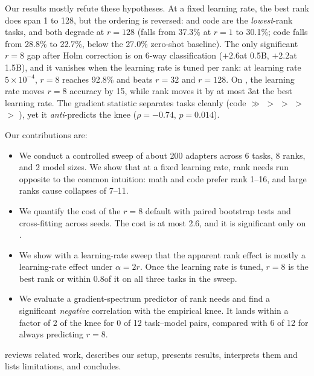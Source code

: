 Our results mostly refute these hypotheses. At a fixed learning rate, the best rank does span 1 to 128, but the ordering is reversed: \gsm and code are the \emph{lowest}-rank tasks, and both degrade at $r{=}128$ (\gsm falls from 37.3\% at $r{=}1$ to 30.1\%; code falls from 28.8\% to 22.7\%, below the 27.0\% zero-shot baseline). The only significant $r{=}8$ gap after Holm correction is on 6-way \emotion classification ($+2.6$\pp at 0.5B, $+2.2$\pp at 1.5B), and it vanishes when the learning rate is tuned per rank: at learning rate $5\times10^{-4}$, $r{=}8$ reaches 92.8\% and beats $r{=}32$ and $r{=}128$. On \emotion, the learning rate moves $r{=}8$ accuracy by 15\pp, while rank moves it by at most 3\pp at the best learning rate. The gradient statistic separates tasks cleanly (code $\gg$ \gsm $>$ \boolq $>$ \agnews $>$ \emotion $>$ \sst), yet it \emph{anti}-predicts the knee ($\rho=-0.74$, $p=0.014$).

Our contributions are:
\begin{itemize}[leftmargin=*,itemsep=0pt,topsep=0pt]
    \item We conduct a controlled sweep of about 200 \lora adapters across 6 tasks, 8 ranks, and 2 model sizes. We show that at a fixed learning rate, rank needs run opposite to the common intuition: math and code prefer rank 1--16, and large ranks cause collapses of 7--11\pp.
    \item We quantify the cost of the $r{=}8$ default with paired bootstrap tests and cross-fitting across seeds. The cost is at most 2.6\pp, and it is significant only on \emotion.
    \item We show with a learning-rate sweep that the apparent rank effect is mostly a learning-rate effect under $\alpha=2r$. Once the learning rate is tuned, $r{=}8$ is the best rank or within 0.8\pp of it on all three tasks in the sweep.
    \item We evaluate a gradient-spectrum predictor of rank needs and find a significant \emph{negative} correlation with the empirical knee. It lands within a factor of 2 of the knee for 0 of 12 task--model pairs, compared with 6 of 12 for always predicting $r{=}8$.
\end{itemize}

 reviews related work,  describes our setup,  presents results,  interprets them and lists limitations, and  concludes.
